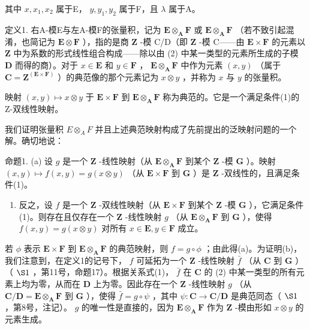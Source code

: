 其中 \(x, x_{1}, x_{2}\) 属于E， \(y, y_{1}, y_{2}\) 属于F，且 \(\lambda\) 属于A。

定义1. 右A-模E与左A-模F的张量积，记为 \(\mathbf{E} \otimes_{\mathbf{A}} \mathbf{F}\) 或 \(\mathbf{E} \otimes_{\mathbf{A}} \mathbf{F}\) （若不致引起混淆，也简记为 \(\mathbf{E} \otimes \mathbf{F}\) ），指的是商 \(\mathbf{Z}\) -模 C/D（即 \(\mathbf{Z}\) -模 C——由 \(\mathbf{E} \times \mathbf{F}\) 的元素以 \(\mathbf{Z}\) 中为系数的形式线性组合构成——除以由 (2) 中某一类型的元素所生成的子模 \(\mathbf{D}\) 而得的商）。对于 \(x \in \mathbf{E}\) 和 \(y \in \mathbf{F}\) ， \(\mathbf{E} \otimes_{\mathbf{A}} \mathbf{F}\) 中作为元素 \((x, y)\) （属于 \(\mathbf{C} = \mathbf{Z}^{(\mathbf{E} \times \mathbf{F})}\) ）的典范像的那个元素记为 \(x \otimes y\) ，并称为 \(x\) 与 \(y\) 的张量积。

映射 \((x,y)\mapsto x\otimes y\) 于 \(\mathbf{E}\times \mathbf{F}\) 到 \(\mathbf{E}\otimes_{\mathbf{A}}\mathbf{F}\) 称为典范的。它是一个满足条件(1)的Z-双线性映射。

我们证明张量积 \(E \otimes_{A} F\) 并且上述典范映射构成了先前提出的泛映射问题的一个解。确切地说：

命题1. (a) 设 \(g\) 是一个 \(\mathbf{Z}\) -线性映射（从 \(\mathbf{E} \otimes_{\mathbf{A}} \mathbf{F}\) 到某个 \(\mathbf{Z}\) -模 \(\mathbf{G}\) ）。映射 \((x, y) \mapsto f(x, y) = g(x \otimes y)\) （从 \(\mathbf{E} \times \mathbf{F}\) 到 \(\mathbf{G}\) ）是 \(\mathbf{Z}\) -双线性的，且满足条件(1)。

\begin{enumerate}
\def\labelenumi{(\alph{enumi})}
\setcounter{enumi}{1}
\tightlist
\item
  反之，设 \(f\) 是一个 \(\mathbf{Z}\) -双线性映射（从 \(\mathbf{E} \times \mathbf{F}\) 到某个 \(\mathbf{Z}\) -模 \(\mathbf{G}\) ），它满足条件(1)。则存在且仅存在一个 \(\mathbf{Z}\) -线性映射 \(g\) （从 \(\mathbf{E} \otimes_{\mathbf{A}} \mathbf{F}\) 到 \(\mathbf{G}\) ），使得 \(f(x,y) = g(x \otimes y)\) 对所有 \(x \in \mathbf{E}, y \in \mathbf{F}\) 成立。
\end{enumerate}

若 \(\phi\) 表示 \(\mathbf{E} \times \mathbf{F}\) 到 \(\mathbf{E} \otimes_{\mathbf{A}} \mathbf{F}\) 的典范映射，则 \(f = g \circ \phi\) ；由此得(a)。为证明(b)，我们注意到，在定义1的记号下， \(f\) 可延拓为一个 \(\mathbf{Z}\) -线性映射 \(\bar{f}\) （从 \(\mathbf{C}\) 到 \(\mathbf{G}\) ）（ \(\S 1\) ，第11号，命题17）。根据关系式(1)， \(\bar{f}\) 在 \(\mathbf{C}\) 的 (2) 中某一类型的所有元素上均为零，从而在 \(\mathbf{D}\) 上为零。因此存在一个 \(\mathbf{Z}\) -线性映射 \(g\) （从 \(\mathbf{C} / \mathbf{D} = \mathbf{E} \otimes_{\mathbf{A}} \mathbf{F}\) 到 \(\mathbf{G}\) ），使得 \(\bar{f} = g \circ \psi\) ，其中 \(\psi: \mathbf{C} \to \mathbf{C} / \mathbf{D}\) 是典范同态（ \(\S 1\) ，第8号，注记）。 \(g\) 的唯一性是直接的，因为 \(\mathbf{E} \otimes_{\mathbf{A}} \mathbf{F}\) 作为 \(\mathbf{Z}\) -模由形如 \(x \otimes y\) 的元素生成。

